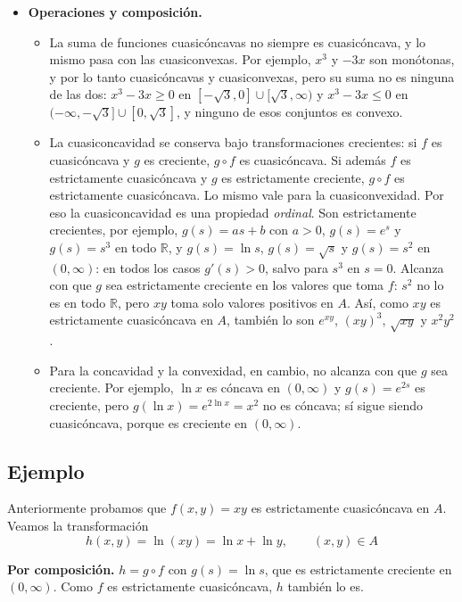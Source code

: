 \documentclass{article}
\newcommand{\R}{\ensuremath{\mathbb{R}}}
\begin{document}
\begin{itemize}
  \item \textbf{Operaciones y composición.}
    \begin{itemize}
      \item La suma de funciones cuasicóncavas no siempre es cuasicóncava, y lo mismo pasa con las cuasiconvexas. Por ejemplo, \(x^3\) y \(-3x\) son monótonas, y por lo tanto cuasicóncavas y cuasiconvexas, pero su suma no es ninguna de las dos: \(x^3-3x\ge0\) en \([-\sqrt3,0]\cup[\sqrt3,\infty)\) y \(x^3-3x\le0\) en \((-\infty,-\sqrt3]\cup[0,\sqrt3]\), y ninguno de esos conjuntos es convexo.
      \item La cuasiconcavidad se conserva bajo transformaciones crecientes: si \(f\) es cuasicóncava y \(g\) es creciente, \(g\circ f\) es cuasicóncava. Si además \(f\) es estrictamente cuasicóncava y \(g\) es estrictamente creciente, \(g\circ f\) es estrictamente cuasicóncava. Lo mismo vale para la cuasiconvexidad. Por eso la cuasiconcavidad es una propiedad \emph{ordinal}. Son estrictamente crecientes, por ejemplo, \(g(s)=as+b\) con \(a>0\), \(g(s)=e^s\) y \(g(s)=s^3\) en todo \(\R\), y \(g(s)=\ln s\), \(g(s)=\sqrt{s}\) y \(g(s)=s^2\) en \((0,\infty)\): en todos los casos \(g'(s)>0\), salvo para \(s^3\) en \(s=0\). Alcanza con que \(g\) sea estrictamente creciente en los valores que toma \(f\): \(s^2\) no lo es en todo \(\R\), pero \(xy\) toma solo valores positivos en \(A\). Así, como \(xy\) es estrictamente cuasicóncava en \(A\), también lo son \(e^{xy}\), \((xy)^3\), \(\sqrt{xy}\) y \(x^2y^2\).
      \item Para la concavidad y la convexidad, en cambio, no alcanza con que \(g\) sea creciente. Por ejemplo, \(\ln x\) es cóncava en \((0,\infty)\) y \(g(s)=e^{2s}\) es creciente, pero \(g(\ln x)=e^{2\ln x}=x^2\) no es cóncava; sí sigue siendo cuasicóncava, porque es creciente en \((0,\infty)\).
    \end{itemize}
\end{itemize}

\subsection*{Ejemplo}

Anteriormente probamos que \(f(x,y)=xy\) es estrictamente cuasicóncava en \(A\). Veamos la transformación
\[
h(x,y)=\ln(xy)=\ln x+\ln y,\qquad (x,y)\in A
\]

\noindent\textbf{Por composición.} \(h=g\circ f\) con \(g(s)=\ln s\), que es estrictamente creciente en \((0,\infty)\). Como \(f\) es estrictamente cuasicóncava, \(h\) también lo es.
\end{document}
